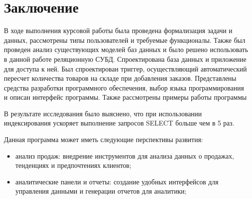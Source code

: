 \chapter*{Заключение}

В ходе  выполнения курсовой работы была проведена формализация задачи и данных, рассмотрены типы пользователей и требуемые функционалы. Также был проведен анализ существующих моделей баз данных и было решено использовать в данной работе реляционную СУБД. Спроектирована база данных и приложение для доступа к ней. Был спроектирован триггер, осуществляющий автоматический пересчет количества товаров на складе при добавления заказов. Представлены средства разработки программного обеспечения, выбор языка программирования и описан интерфейс программы.
Также рассмотрены примеры работы программы

В результате исследования было выяснено, что при использовании индексирования ускоряет выполнение запросов SELECT больше чем в 5 раз.

Данная программа может иметь следующие перспективы развития:
\begin{itemize}[label=---]
	\item анализ продаж: внедрение инструментов для анализа данных о продажах, тенденциях и предпочтениях клиентов;
	\item аналитические панели и отчеты: создание удобных интерфейсов для управления данными и генерации отчетов для аналитики;
\end{itemize}
